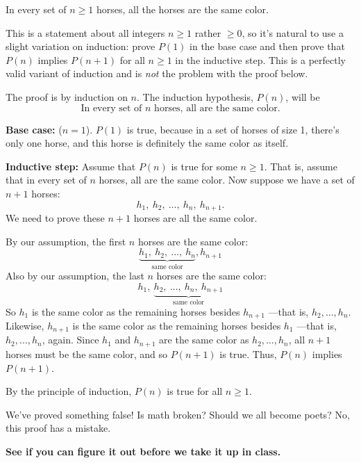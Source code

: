 \begin{falsethm}\label{horses}
In every set of $n \geq 1$ horses, all the horses are the same color.
\end{falsethm}

This is a statement about all integers $n \geq 1$ rather $\geq 0$, so it's
natural to use a slight variation on induction: prove $P(1)$ in the base
case and then prove that $P(n)$ implies $P(n+1)$ for all $n \geq 1$ in the
inductive step.  This is a perfectly valid variant of induction and is
\emph{not} the problem with the proof below.

\begin{bogusproof}

The proof is by induction on $n$.  The induction hypothesis, $P(n)$,
will be
\begin{equation}\label{horsehyp}
\text{In every set of $n$ horses, all are the same color.}
\end{equation}

\textbf{Base case:} ($n=1$).  $P(1)$ is true, because in a set of horses
of size 1, there's only one horse, and this horse is definitely the same
color as itself.

\textbf{Inductive step:} Assume that $P(n)$ is true for some $n \geq 1$.
That is, assume that in every set of $n$ horses, all are the same color.
Now suppose we have a set of $n+1$ horses:
\[
h_1,\ h_2,\ \dots,\ h_n,\ h_{n+1}.
\]
We need to prove these $n+1$ horses are all the same color.

By our assumption, the first $n$ horses are the same color:
\[
\underbrace{h_1,\ h_2,\ \dots,\ h_n}_{\text{same color}}, h_{n+1}
\]
Also by our assumption, the last $n$ horses are the same color:
\[
h_1,\ \underbrace{h_2,\ \dots,\ h_n,\ h_{n+1}}_{\text{same color}}
\]
So $h_1$ is the same color as the remaining horses besides $h_{n+1}$
---that is, $h_2, \dots, h_n$.  Likewise, $h_{n+1}$ is the same
color as the remaining horses besides $h_1$ ---that is, $h_2, \dots,
h_n$, again.  Since $h_1$ and $h_{n+1}$ are the same color as $h_2,
\dots, h_n$, all $n+1$ horses must be the same color, and so $P(n+1)$
is true.  Thus, $P(n)$ implies $P(n+1)$.

By the principle of induction, $P(n)$ is true for all $n \geq 1$.
\end{bogusproof}
We've proved something false!  Is math broken?  Should we all become
poets?  No, this proof has a mistake.


\textbf{See if you can figure it out before we take it up in class.}

